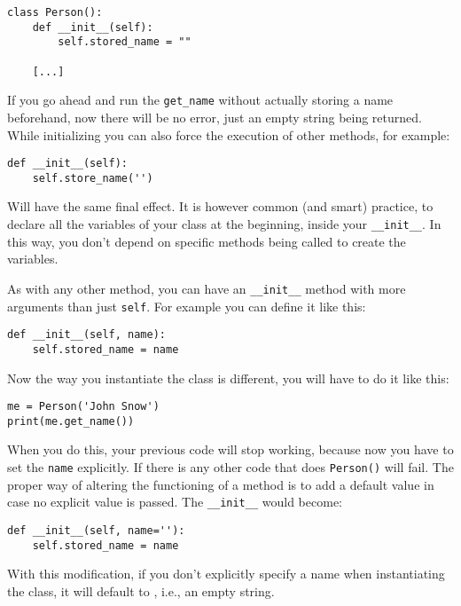 \begin{verbatim}
class Person():
    def __init__(self):
        self.stored_name = ""

    [...]
\end{verbatim}

If you go ahead and run the \texttt{get_name} without actually storing
a name beforehand, now there will be no error, just an empty string
being returned. While initializing you can also force the execution of
other methods, for example:

\begin{verbatim}
def __init__(self):
    self.store_name('')
\end{verbatim}

Will have the same final effect. It is however common (and smart)
practice, to declare all the variables of your class at the beginning,
inside your \texttt{__init__}. In this way, you don't depend on
specific methods being called to create the variables. 

As with any other method, you can have an \texttt{__init__} method with more
arguments than just \texttt{self}. For example you can define it like
this:

\begin{verbatim}
def __init__(self, name):
    self.stored_name = name
\end{verbatim}

Now the way you instantiate the class is different, you will have to do
it like this:

\begin{verbatim}
me = Person('John Snow')
print(me.get_name())
\end{verbatim}

When you do this, your previous code will stop working, because now you have to set the \texttt{name} explicitly. If there is any other code that does \texttt{Person()} will fail. The proper way of altering the functioning of a method is to add a default value in case no explicit value is passed. The \texttt{__init__} would become:

\begin{verbatim}
def __init__(self, name=''):
    self.stored_name = name
\end{verbatim}

With this modification, if you don't explicitly specify a name when instantiating the class, it will default to , i.e., an empty string.

